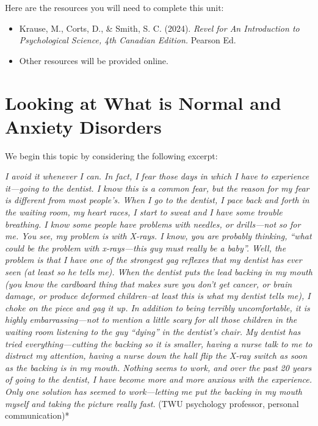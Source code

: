 \documentclass[
]{book}
\providecommand{\tightlist}{%
  \setlength{\itemsep}{0pt}\setlength{\parskip}{0pt}}
\begin{document}
Here are the resources you will need to complete this unit:

\begin{itemize}
\tightlist
\item
  Krause, M., Corts, D., \& Smith, S. C. (2024). \emph{Revel for An Introduction to Psychological Science, 4th Canadian Edition.} Pearson Ed.\\
\item
  Other resources will be provided online.
\end{itemize}

\hypertarget{looking-at-what-is-normal-and-anxiety-disorders}{%
\section{Looking at What is Normal and Anxiety Disorders}\label{looking-at-what-is-normal-and-anxiety-disorders}}

We begin this topic by considering the following excerpt:

\emph{I avoid it whenever I can. In fact, I fear those days in which I have to experience it---going to the dentist. I know this is a common fear, but the reason for my fear is different from most people's. When I go to the dentist, I pace back and forth in the waiting room, my heart races, I start to sweat and I have some trouble breathing. I know some people have problems with needles, or drills---not so for me. You see, my problem is with X-rays. I know, you are probably thinking, ``what could be the problem with x-rays---this guy must really be a baby''. Well, the problem is that I have one of the strongest gag reflexes that my dentist has ever seen (at least so he tells me). When the dentist puts the lead backing in my mouth (you know the cardboard thing that makes sure you don't get cancer, or brain damage, or produce deformed children--at least this is what my dentist tells me), I choke on the piece and gag it up. In addition to being terribly uncomfortable, it is highly embarrassing---not to mention a little scary for all those children in the waiting room listening to the guy ``dying'' in the dentist's chair. My dentist has tried everything---cutting the backing so it is smaller, having a nurse talk to me to distract my attention, having a nurse down the hall flip the X-ray switch as soon as the backing is in my mouth. Nothing seems to work, and over the past 20 years of going to the dentist, I have become more and more anxious with the experience. Only one solution has seemed to work---letting me put the backing in my mouth myself and taking the picture really fast.} (TWU psychology professor, personal communication)*
\end{document}
